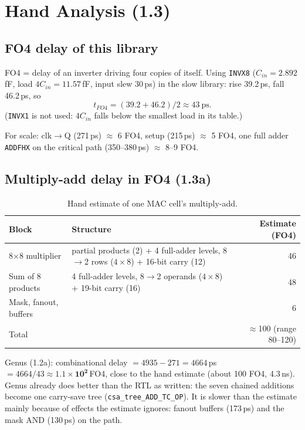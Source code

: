 
\section{Hand Analysis (1.3)}

\subsection{FO4 delay of this library}

FO4 = delay of an inverter driving four copies of itself. Using \texttt{INVX8}
($C_{in} = 2.892$\,fF, load $4C_{in} = 11.57$\,fF, input slew 30\,ps) in the slow library:
rise 39.2\,ps, fall 46.2\,ps, so
\[
t_{FO4} = (39.2 + 46.2)/2 \approx 43\ \text{ps}.
\]
(\texttt{INVX1} is not used: $4C_{in}$ falls below the smallest load in its table.)

For scale: clk$\rightarrow$Q (271\,ps) $\approx$ 6 FO4, setup (215\,ps) $\approx$ 5 FO4,
one full adder \texttt{ADDFHX} on the critical path (350--380\,ps) $\approx$ 8--9 FO4.

\subsection{Multiply-add delay in FO4 (1.3a)}

\begin{table}[H]
\centering
\small
\begin{tabular}{lp{8.5cm}r}
\toprule
Block & Structure & Estimate (FO4) \\
\midrule
8$\times$8 multiplier & partial products (2) + 4 full-adder levels, 8$\rightarrow$2 rows ($4\times8$) + 16-bit carry (12) & 46 \\
Sum of 8 products     & 4 full-adder levels, 8$\rightarrow$2 operands ($4\times8$) + 19-bit carry (16) & 48 \\
Mask, fanout, buffers &  & 6 \\
\midrule
Total                 &  & $\approx$100 (range 80--120) \\
\bottomrule
\end{tabular}
\caption{Hand estimate of one MAC cell's multiply-add.}
\end{table}

Genus (1.2a): combinational delay $= 4935 - 271 = 4664$\,ps $= 4664/43 \approx \mathbf{1.1\times10^2}$\,FO4,
close to the hand estimate (about 100 FO4, 4.3\,ns).
Genus already does better than the RTL as written: the seven chained additions become one
carry-save tree (\texttt{csa\_tree\_ADD\_TC\_OP}). It is slower than the estimate mainly because of
effects the estimate ignores: fanout buffers (173\,ps) and the mask AND (130\,ps) on the path.

